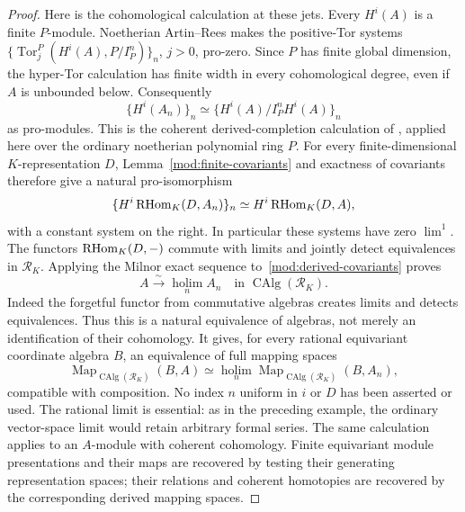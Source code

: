 \begin{proof}
Here is the cohomological calculation at these jets. Every $H^i(A)$
is a finite $P$-module. Noetherian Artin--Rees makes the positive-Tor
systems
$\{\operatorname{Tor}^P_j(H^i(A),P/I_P^n)\}_n$, $j>0$,
pro-zero. Since $P$ has finite global dimension, the hyper-Tor
calculation has finite width in every cohomological degree, even if
$A$ is unbounded below. Consequently
\[
 \{H^i(A_n)\}_n\simeq
 \{H^i(A)/I_P^nH^i(A)\}_n
\]
as pro-modules. This is the coherent derived-completion calculation
of \cite[Tags~00MA, 0A06, and~0BKH]{Stacks}, applied here over the
ordinary noetherian polynomial ring $P$.
For every finite-dimensional $K$-representation $D$,
Lemma~\ref{mod:finite-covariants} and exactness of covariants therefore
give a natural pro-isomorphism
\begin{equation}
\label{mod:derived-covariants}
 \{H^i\operatorname{RHom}_K(D,A_n)\}_n
 \simeq H^i\operatorname{RHom}_K(D,A),
\end{equation}
with a constant system on the right. In particular these systems
have zero $\lim^1$. The functors $\operatorname{RHom}_K(D,-)$ commute with limits
and jointly detect equivalences in $\mathcal R_K$. Applying the
Milnor exact sequence to~\eqref{mod:derived-covariants} proves
\begin{equation}
\label{mod:rational-derived-completion}
 A\xrightarrow{\sim}\operatorname*{holim}_n A_n
       \quad\text{in }\operatorname{CAlg}(\mathcal R_K).
\end{equation}
Indeed the forgetful functor from commutative algebras creates limits
and detects equivalences. Thus this is a natural equivalence of
algebras, not merely an identification of their cohomology. It gives,
for every rational equivariant coordinate algebra $B$, an equivalence
of full mapping spaces
\begin{equation}
\label{mod:mapping-spaces}
 \operatorname{Map}_{\operatorname{CAlg}(\mathcal R_K)}(B,A)
 \simeq
 \operatorname*{holim}_n
 \operatorname{Map}_{\operatorname{CAlg}(\mathcal R_K)}(B,A_n),
\end{equation}
compatible with composition. No index $n$ uniform in $i$ or $D$ has
been asserted or used. The rational limit is essential: as in the preceding example, the
ordinary vector-space limit would retain arbitrary formal series.
The same calculation applies to an $A$-module with coherent
cohomology. Finite equivariant module presentations and their maps
are recovered by testing their generating representation spaces;
their relations and coherent homotopies are recovered by the
corresponding derived mapping spaces.


\end{proof}
